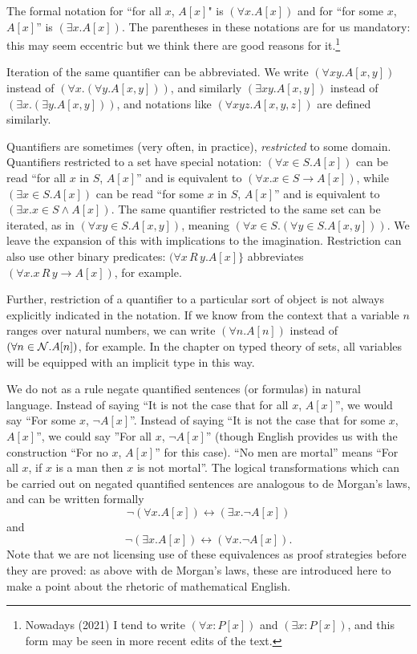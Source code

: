 \documentclass[12pt]{book}
\begin{document}
The formal notation for ``for all $x$, $A[x]$" is $(\forall x.A[x])$
and for ``for some $x$, $A[x]$'' is $(\exists x.A[x])$.  The
parentheses in these notations are for us mandatory: this may seem
eccentric but we think there are good reasons for it.\footnote{Nowadays (2021) I tend to write $(\forall x:P[x])$ and $(\exists x:P[x])$, and this form may be seen in more recent edits of the text.}

Iteration of the same quantifier can be abbreviated.  We write
$(\forall xy.A[x,y])$ instead of $(\forall x.(\forall y.A[x,y]))$, and
similarly $(\exists xy.A[x,y])$ instead of $(\exists x.(\exists
y.A[x,y]))$, and notations like $(\forall xyz.A[x,y,z])$ are defined
similarly.

Quantifiers are sometimes (very often, in practice), {\em
restricted\/} to some domain.  Quantifiers restricted to a set have
special notation: $(\forall x\in S.A[x])$ can be read ``for all $x$ in
$S$, $A[x]$'' and is equivalent to $(\forall x.x\in S \rightarrow
A[x])$, while $(\exists x\in S.A[x])$ can be read ``for some $x$ in
$S$, $A[x]$'' and is equivalent to $(\exists x.x\in S \wedge A[x])$.
The same quantifier restricted to the same set can be iterated, as in
$(\forall xy\in S.A[x,y])$, meaning $(\forall x \in S.(\forall y \in S.A[x,y]))$.  We leave the expansion of this with implications to the imagination.
Restriction can also use other binary predicates:  $(\forall x \, R \, y. A[x]\}$ abbreviates $(\forall x.x \, R \, y \rightarrow A[x])$, for example.

Further, restriction of a quantifier to a particular sort of object is
not always explicitly indicated in the notation.  If we know from the
context that a variable $n$ ranges over natural numbers, we can write
$(\forall n.A[n])$ instead of $(\forall n \in {\cal N}.A[n])$, for
example.  In the chapter on typed theory of sets, all variables will
be equipped with an implicit type in this way.

We do not as a rule negate quantified sentences (or formulas) in
natural language.  Instead of saying ``It is not the case that for all
$x$, $A[x]$'', we would say ``For some $x$, $\neg A[x]$''.  Instead of
saying ``It is not the case that for some $x$, $A[x]$'', we could say
''For all $x$, $\neg A[x]$'' (though English provides us with the
construction ``For no $x$, $A[x]$'' for this case).  ``No men are
mortal'' means ``For all $x$, if $x$ is a man then $x$ is not
mortal''.  The logical transformations which can be carried out on
negated quantified sentences are analogous to de Morgan's laws, and
can be written formally $$\neg(\forall x.A[x]) \leftrightarrow (\exists x.\neg
A[x])$$ and $$\neg(\exists x.A[x]) \leftrightarrow (\forall x.\neg A[x]).$$ Note
that we are not licensing use of these equivalences as proof strategies
before they are proved: as above with de Morgan's laws, these are
introduced here to make a point about the rhetoric of mathematical
English.
\end{document}
